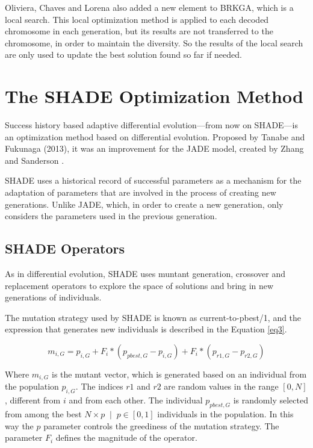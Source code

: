 \documentclass[review]{elsarticle}
\begin{document}
Oliviera, Chaves and Lorena also added a new element to BRKGA, which is a local search. This local optimization method is applied to each decoded chromosome in each generation, but its results are not transferred to the chromosome, in order to maintain the diversity. So the results of the local search are only used to update the best solution found so far if needed.

\section{The SHADE Optimization Method}

Success history based adaptive differential evolution---from now on SHADE---is an optimization method based on differential evolution. Proposed by Tanabe and Fukunaga (2013), it was an improvement for the JADE model, created by Zhang and Sanderson \cite{tanabe2013success}\cite{zhang2009jade}.

SHADE uses a historical record of successful parameters as a mechanism for the adaptation of parameters that are involved in the process of creating new generations. Unlike JADE, which, in order to create a new generation, only considers the parameters used in the previous generation. 

\subsection{SHADE Operators}

As in differential evolution, SHADE uses muntant generation, crossover and replacement operators to explore the space of solutions and bring in new generations of individuals.

The mutation strategy used by SHADE is known as current-to-pbest/1, and the expression that generates new individuals is described in the Equation \eqref{eq3}.

\begin{equation}
m_{i,G} = p_{i,G} + F_i * (p_{pbest, G} - p_{i,G}) + F_i * (p_{r1, G} - p_{r2,G})
\label{eq3}
\end{equation}

Where $m_{i,G}$ is the mutant vector, which is generated based on an individual from the population $p_{i,G}$. The indices $r1$ and $r2$ are random values in the range $[0,N]$, different from $i$ and from each other. The individual $p_{pbest, G}$ is randomly selected from among the best $N \times p\;\;|\;\;p\in [0,1]$ individuals in the population. In this way the $p$ parameter controls the greediness of the mutation strategy. The parameter $F_i$ defines the magnitude of the operator.
\end{document}
